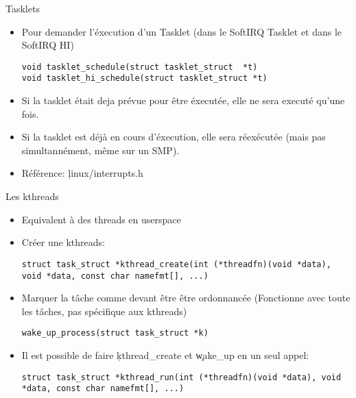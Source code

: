 \begin{frame}[fragile=singleslide]{Tasklets}
  \begin{itemize} 
  \item Pour demander l'éxecution d'un Tasklet (dans le SoftIRQ Tasklet et dans le SoftIRQ HI)
    \begin{lstlisting} 
void tasklet_schedule(struct tasklet_struct  *t)
void tasklet_hi_schedule(struct tasklet_struct *t)
    \end{lstlisting} 
  \item Si  la tasklet était deja  prévue pour être  éxecutée, elle ne
    sera executé qu'une fois.
  \item  Si  la tasklet  est  déjà  en  cours d'éxecution,  elle  sera
    réexécutée (mais pas simultannément, même sur un SMP).
  \item Référence: \c{linux/interrupts.h}
  \end{itemize}
\end{frame} 

\begin{frame}[fragile=singleslide]{Les kthreads}
  \begin{itemize}
  \item Equivalent à des threads en userspace
  \item Créer une kthreads:
    \begin{lstlisting} 
struct task_struct *kthread_create(int (*threadfn)(void *data), void *data, const char namefmt[], ...)
    \end{lstlisting} 
  \item  Marquer   la  tâche   comme  devant  être   être  ordonnancée
    (Fonctionne avec toute les tâches, pas spécifique aux kthreads)
    \begin{lstlisting} 
wake_up_process(struct task_struct *k)
    \end{lstlisting} 
  \item Il est possible de faire \c{kthread_create} et \c{wake_up} en
    un seul appel:
    \begin{lstlisting} 
struct task_struct *kthread_run(int (*threadfn)(void *data), void *data, const char namefmt[], ...)
    \end{lstlisting}
  \end{itemize}
\end{frame}

